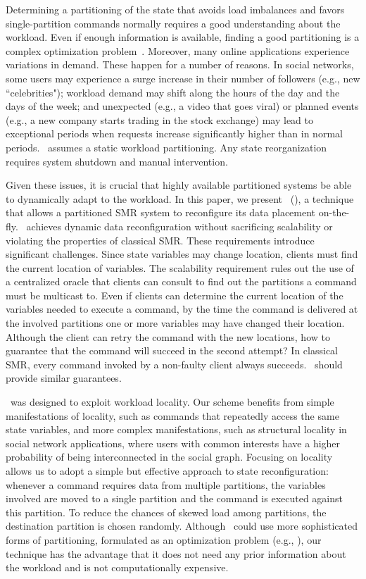 Determining a partitioning of the state that avoids load imbalances and favors single-partition commands normally requires a good understanding about the workload.
Even if enough information is available, finding a good partitioning is a complex optimization problem~\cite{curino2010sch,taft2014est}.
Moreover, many online applications experience variations in demand.
These happen for a number of reasons.
In social networks, some users may experience a surge increase in their number of followers (e.g., new ``celebrities");
workload demand may shift along the hours of the day and the days of the week; and unexpected (e.g., a video that goes viral) or planned events (e.g., a new company starts trading in the stock exchange) may lead to exceptional periods when requests increase significantly higher than in normal periods.
\ssmr\ assumes a static workload partitioning.
Any state reorganization requires system shutdown and manual intervention.

Given these issues, it is crucial that highly available partitioned systems be able to dynamically adapt to the workload.
In this paper, we present \dssmrlong\ (\dssmr), a technique that allows a partitioned SMR system to reconfigure its data placement on-the-fly.
\dssmr\ achieves dynamic data reconfiguration without sacrificing scalability or violating the properties of classical SMR.
These requirements introduce significant challenges.
Since state variables may change location, clients must find the current location of variables.
The scalability requirement rules out the use of a centralized oracle that clients can consult to find out the partitions a command must be multicast to.
Even if clients can determine the current location of the variables needed to execute a command, by the time the command is delivered at the involved partitions one or more variables may have changed their location.
Although the client can retry the command with the new locations, how to guarantee that the command will succeed in the second attempt?
In classical SMR, every command invoked by a non-faulty client always succeeds.
\dssmr\ should provide similar guarantees.

\dssmr\ was designed to exploit workload locality.
Our scheme benefits from simple manifestations of locality, such as commands that repeatedly access the same state variables, and more complex manifestations, such as structural locality in social network applications, where users with common interests have a higher probability of being interconnected in the social graph.
Focusing on locality allows us to adopt a simple but effective approach to state reconfiguration: whenever a command requires data from multiple partitions, the variables involved are moved to a single partition and the command is executed against this partition.
To reduce the chances of skewed load among partitions, the destination partition is chosen randomly.
Although \dssmr\ could use more sophisticated forms of partitioning, formulated as an optimization problem (e.g., \cite{curino2010sch,taft2014est}), our technique has the advantage that it does not need any prior information about the workload and is not computationally expensive.

